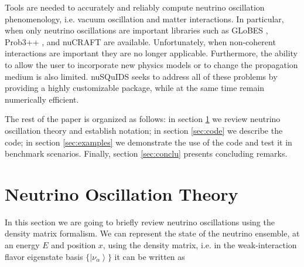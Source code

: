 \documentclass[3p,12pt]{elsarticle}
\newcommand{\ket}[1]{\ensuremath{\left|#1\right\rangle}}
\newcommand{\ttf}{\ttfamily}
\begin{document}
Tools are needed to accurately and reliably compute neutrino
oscillation phenomenology, i.e. vacuum oscillation and matter
interactions. In particular, when only neutrino
oscillations are important libraries such as {\ttf GLoBES}
\citep{Huber:2007ji}, {\ttf Prob3++} \citep{prob3pp, Calland:2013vaa},  and {\ttf
  nuCRAFT} \citep{Wallraff:2014vl} are available. Unfortunately, when non-coherent interactions are
important they are no longer applicable. Furthermore, the ability to
allow the user to incorporate new physics models or to change the
propagation medium is also limited. {\ttf nuSQuIDS} seeks to
address all of these problems by providing a highly customizable
package, while at the same time remain numerically efficient.

The rest of the paper is organized as follows: in section \ref{sec:theory} we review neutrino oscillation theory and establish notation; in section \ref{sec:code} we describe the code; in section \ref{sec:examples} we demonstrate the use of the code and test it in benchmark scenarios. Finally, section \ref{sec:conclu} presents concluding remarks.

\section{Neutrino Oscillation Theory}
\label{sec:theory} 
In this section we are going to briefly review neutrino oscillations
using the density matrix formalism.
We can represent the state of the neutrino ensemble, at an energy $E$
and position $x$, using the density
matrix, i.e. in the weak-interaction flavor eigenstate basis
$\{\ket{\nu_\alpha}\}$  it can be written as
\end{document}
